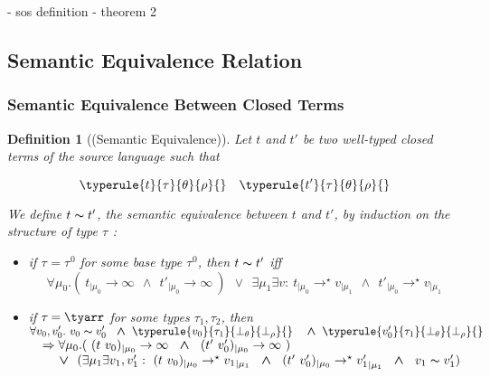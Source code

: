 \documentclass[a4paper,11pt,oneside]{article}
\theoremstyle{plain}
\newtheorem{definition}{Definition}[subsection]
\newcommand{\tmapp}[2]{(#1 ~ #2)}
\newcommand{\ty}[1][]{\tau_{#1}}
\newcommand{\bwedge}{\boldsymbol{~\wedge~}}
\newcommand{\bvee}{\boldsymbol{~\vee~}}
\newcommand{\evalstar}[4]{~#1_{|\mu_#2} \rightarrow^{\star} #3_{|\mu_#4} ~}
\newcommand{\evalinfty}[2]{~#1_{|#2} \rightarrow \infty ~}
\newcommand{\eqv}[1]{#1 \thicksim #1'}
\begin{document}
- sos definition
- theorem 2	
	
\subsection{Semantic Equivalence Relation}

\subsubsection*{Semantic Equivalence Between Closed Terms}

\label{semantic equivalence}
\begin{definition}[(Semantic Equivalence)]
	Let $t$ and $t'$ be two well-typed closed terms of the source 
	language such that 
	
	$$
		\typerule{t}{\tau}{\theta}{\rho}{} \quad \typerule{t'}{\tau}{\theta}{\rho}{} 
	$$

	We define $\eqv{t}$, the \textit{semantic equivalence} between $t$ and $t'$, 
	by induction on the structure of type $\ty$ :
	
	\begin{itemize}
		\item[$(\alpha)$]

			if $\ty{} = \ty{}^0$ for some base type $\ty{}^0$, then $\eqv{t}$ iff
			$$	\forall \mu_0.(\evalinfty{t}{\mu_0} \bwedge \evalinfty{t'}{\mu_0})~
					\bvee ~ \exists \mu_1 \exists v: 
					\evalstar{t}{0}{v}{1} \bwedge \evalstar{t'}{0}{v}{1} $$
		
		\item[$(\beta)$]
			if $\ty = \tyarr$ for some types $\ty[1], \ty[2]$,
			then\\[0.2cm]
			$\hspace*{0em}\forall v_0, v'_0. ~ \eqv{v_0} ~ 
			\bwedge \typerule{v_0}{\ty[1]}{\bot_\theta}{\bot_\rho}{} ~~
			\bwedge \typerule{v'_0}{\ty[1]}{\bot_\theta}{\bot_\rho}{} $ \\[0.2cm]
			$\hspace*{1em}
			\Rightarrow \forall\mu_0.(\evalinfty{\tmapp{t}{v_0}}{\mu_0}
			\bwedge\evalinfty{\tmapp{t'}{v'_0}}{\mu_0})$\\[0.2cm]
			$\hspace*{2em}\bvee~(\exists \mu_1 \exists v_1, v'_1 : 
			 	\evalstar{\tmapp{t}{v_0}}{0}{{v_1}}{1} 
				\bwedge \evalstar{\tmapp{t'}{v'_0}}{0}{{v'_1}}{1}
				\bwedge~\eqv{v_1})$				
	\end{itemize}
	\end{definition}
\end{document}
